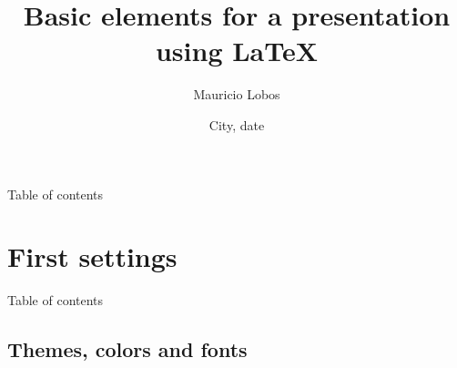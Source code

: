\documentclass[handout]{beamer}
\begin{document}

\author[Mauricio]{Mauricio Lobos}
\title[Basic elements]{Basic elements for a presentation using \LaTeX{}}
\date{City, date}
\frame{\titlepage}


\begin{frame}{Table of contents}
\tableofcontents
\end{frame}


\section{First settings}

\begin{frame}{Table of contents}
\end{frame}


\subsection[Themes]{Themes, colors and fonts}
\end{document}
